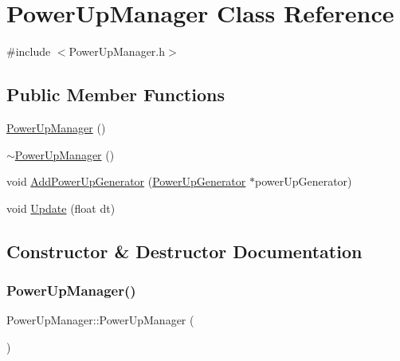 \hypertarget{class_power_up_manager}{}\section{Power\+Up\+Manager Class Reference}
\label{class_power_up_manager}


{\ttfamily \#include $<$Power\+Up\+Manager.\+h$>$}

\subsection*{Public Member Functions}
\begin{DoxyCompactItemize}
\item 
\hyperlink{class_power_up_manager_a4ef551dbd52ba36cb987a082a92d7eda}{Power\+Up\+Manager} ()
\item 
\hyperlink{class_power_up_manager_a75f5252c97897210c751419d901f8775}{$\sim$\+Power\+Up\+Manager} ()
\item 
void \hyperlink{class_power_up_manager_aa9747a32aa586ad78d4af63f4485f09f}{Add\+Power\+Up\+Generator} (\hyperlink{class_power_up_generator}{Power\+Up\+Generator} $\ast$power\+Up\+Generator)
\item 
void \hyperlink{class_power_up_manager_a07d7f5fdb8c7f38d990ee9f3308430c3}{Update} (float dt)
\end{DoxyCompactItemize}


\subsection{Constructor \& Destructor Documentation}
\hypertarget{class_power_up_manager_a4ef551dbd52ba36cb987a082a92d7eda}{}\label{class_power_up_manager_a4ef551dbd52ba36cb987a082a92d7eda} 
\subsubsection{\texorpdfstring{Power\+Up\+Manager()}{PowerUpManager()}}
{\footnotesize\ttfamily Power\+Up\+Manager\+::\+Power\+Up\+Manager (\begin{DoxyParamCaption}{ }\end{DoxyParamCaption})}

\hypertarget{class_power_up_manager_a75f5252c97897210c751419d901f8775}{}\label{class_power_up_manager_a75f5252c97897210c751419d901f8775} 
